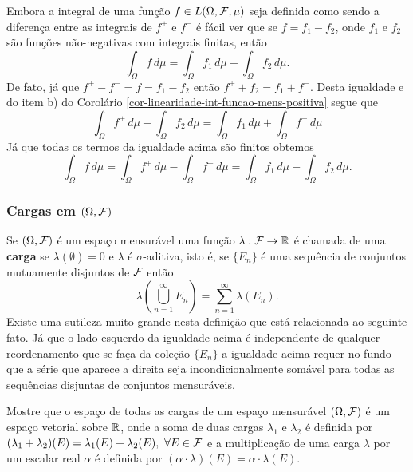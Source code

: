 \begin{observacao}\label{obs-int-diferenca-2func-positivas}
Embora a integral de uma função $f\in L(\Omega,\mathcal{F},\mu)$ 
seja definida como sendo a diferença 
entre as integrais de $f^{+}$
e $f^{-}$ é fácil ver que se $f=f_1-f_2$,
onde $f_1$ e $f_2$ são funções não-negativas 
com integrais finitas, então 
	\[
		\int_{\Omega} f\, d\mu 
		=
		\int_{\Omega} f_1\, d\mu 
		-
		\int_{\Omega} f_2\, d\mu.
	\]
De fato, já que $f^{+}-f^{-}=f=f_1-f_2$ então 
$f^{+}+f_2=f_1+f^{-}$. Desta igualdade 
e do item b) do 
Corolário \ref{cor-linearidade-int-funcao-mens-positiva}
segue que
\[	
	\int_{\Omega}f^{+}\, d\mu 
	+
	\int_{\Omega}f_2\, d\mu 
	=
	\int_{\Omega}f_1\, d\mu 
	+
	\int_{\Omega}f^{-}\, d\mu
\]
Já que todas os termos da igualdade acima 
são finitos obtemos 
\[
	\int_{\Omega}f\, d\mu 
	=
	\int_{\Omega}f^{+}\, d\mu 
	-
	\int_{\Omega}f^{-}\, d\mu 
	=
	\int_{\Omega}f_1\, d\mu 
	-
	\int_{\Omega}f_2\, d\mu.
\]
\end{observacao}


\subsubsection*{Cargas em $(\Omega,\mathcal{F})$ }

Se $(\Omega,\mathcal{F})$ é um espaço mensurável uma 
função $\lambda:\mathcal{F}\to\mathbb{R}$ é chamada de uma 
{\bf carga} 
se $\lambda(\emptyset)=0$ e $\lambda$ 
é $\sigma$-aditiva, isto é, se $\{E_n\}$ é uma
sequência de conjuntos mutuamente disjuntos de $\mathcal{F}$ 
então 
	\[
		\lambda\left(\bigcup_{n=1}^{\infty}E_n\right)
		=
		\sum_{n=1}^{\infty} \lambda(E_n).
	\]
Existe uma sutileza muito grande nesta definição
que está relacionada ao seguinte fato.
Já que o lado esquerdo da igualdade acima é 
independente de qualquer reordenamento que se
faça da coleção $\{E_n\}$ a igualdade acima 
requer no fundo que a série que aparece a direita 
seja incondicionalmente somável para todas as 
sequências disjuntas de conjuntos mensuráveis. 

\begin{exercicio}\label{exercicio-cargas-esp-vet}
Mostre que o espaço de todas as cargas
de um espaço mensurável $(\Omega,\mathcal{F})$ é um espaço vetorial
sobre $\mathbb{R}$, onde a soma de duas cargas 
$\lambda_1$ e $\lambda_2$ é definida por 
$(\lambda_1+\lambda_2)(E)=\lambda_1(E)+\lambda_2(E), 
\ \forall E\in\mathcal{F}$
e a multiplicação de uma carga $\lambda$ 
por um escalar real $\alpha$ é definida por
$(\alpha\cdot \lambda)(E)=\alpha\cdot\lambda(E)$. 
\end{exercicio}


